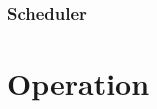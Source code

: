\documentclass{gqtekspec}
\begin{document}
\subsection{Scheduler}

\chapter{Operation}\label{ch:operation}
\end{document}
